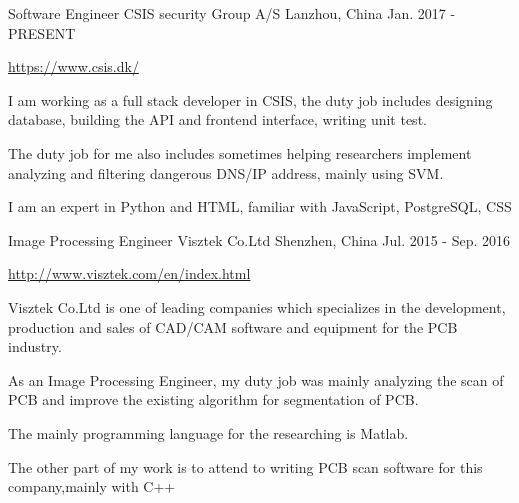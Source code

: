\begin{cventries}
  \cventry
    {Software Engineer}
    {CSIS security Group A/S}
    {Lanzhou, China}
    {Jan. 2017 - PRESENT}
    {
      \begin{cvitems}
        \item {\url{https://www.csis.dk/}}
        \item {I am working as a full stack developer in CSIS, the duty job includes designing database, building the API and frontend interface, writing unit test.}
        \item {The duty job for me also includes sometimes helping researchers implement analyzing and filtering dangerous  DNS/IP address, mainly using SVM.}
        \item {I am an expert in Python and HTML, familiar with JavaScript, PostgreSQL, CSS}
      \end{cvitems}
    }
  \cventry
    {Image Processing Engineer}
    {Visztek Co.Ltd}
    {Shenzhen, China}
    {Jul. 2015 - Sep. 2016}
    {
      \begin{cvitems}
        \item {\url{http://www.visztek.com/en/index.html}}
        \item {Visztek Co.Ltd is one of leading companies which specializes in the development, production and sales of CAD/CAM software and equipment for the PCB industry.}
        \item {As an Image Processing Engineer, my duty job was mainly analyzing the scan of PCB and improve the existing algorithm for segmentation of PCB.}
        \item {The mainly programming language for the researching is Matlab.}
        \item {The other part of my work is to attend to writing PCB scan software for this company,mainly with C++}
      \end{cvitems}
    }
\end{cventries}
